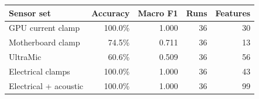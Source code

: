 \begin{tabular}{lrrrr}
\toprule
Sensor set & Accuracy & Macro F1 & Runs & Features \\
\midrule
GPU current clamp & 100.0\% & 1.000 & 36 & 30 \\
Motherboard clamp & 74.5\% & 0.711 & 36 & 13 \\
UltraMic & 60.6\% & 0.509 & 36 & 56 \\
Electrical clamps & 100.0\% & 1.000 & 36 & 43 \\
Electrical + acoustic & 100.0\% & 1.000 & 36 & 99 \\
\bottomrule
\end{tabular}
